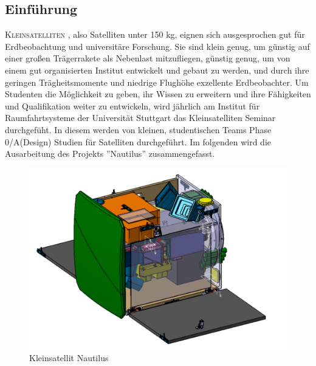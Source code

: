 \documentclass[twoside]{article}
\begin{document}
   \begin{multicols}{2} %


      \section{Einführung}

      \lettrine[nindent=0em,lines=3]{K} {\sc leinsatelliten}
      , also Satelliten unter 150 kg, 
      eignen sich ausgesprochen gut für Erdbeobachtung und universitäre Forschung. 
      Sie sind klein genug, um günstig auf einer großen Trägerrakete als Nebenlast 
      mitzufliegen, günstig genug, um von einem gut organisierten Institut entwickelt 
      und gebaut zu werden, und durch ihre geringen Trägheitsmomente und niedrige 
      Flughöhe exzellente Erdbeobachter. Um Studenten die Möglichkeit zu geben, ihr 
      Wissen zu erweitern und ihre Fähigkeiten und Qualifikation weiter zu 
      entwickeln, wird jährlich am Institut für Raumfahrtsysteme der Universität 
      Stuttgart das Kleinsatelliten Seminar durchgefüht. In diesem werden von
      kleinen, 
      studentischen Teams Phase 0/A(Design) Studien für Satelliten durchgeführt. 
      Im folgenden wird die Ausarbeitung des Projekts ''Nautilus'' zusammengefasst.
      \begin{figure}[H]
         \captionsetup{format=plain}
         \centering
         \includegraphics[width=\linewidth]{sat.png}       
         \caption{Kleinsatellit Nautilus}
      \end{figure}


\end{multicols}
\end{document}
